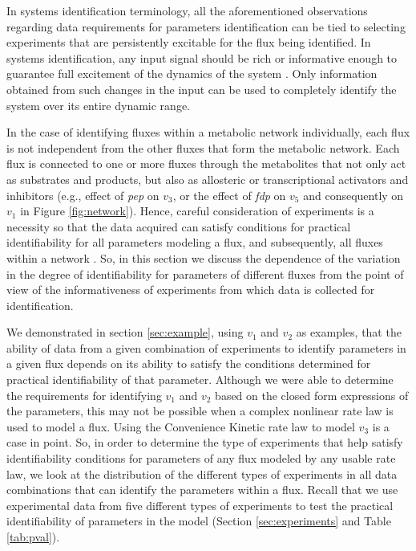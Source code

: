 \documentclass[10pt]{article}
\begin{document}
	In systems identification terminology, all the aforementioned observations regarding data requirements for parameters identification can be tied to selecting experiments that are persistently excitable for the flux being identified. In systems identification, any input signal should be rich or informative enough to guarantee full excitement of the dynamics of the system \parencite{Ljung1994}. Only information obtained from such changes in the input can be used to completely identify the system over its entire dynamic range. %
	
	In the case of identifying fluxes within a metabolic network individually, each flux is not independent from the other fluxes that form the metabolic network. Each flux is connected to one or more fluxes through the metabolites that not only act as substrates and products, but also as allosteric or transcriptional activators and inhibitors (e.g., effect of \textit{pep} on $v_3$, or the effect of \textit{fdp} on $v_5$ and consequently on $v_1$ in Figure \ref{fig:network}). Hence, careful consideration of experiments is a necessity so that the data acquired can satisfy conditions for practical identifiability for all parameters modeling a flux, and subsequently, all fluxes within a network \parencite{Heijnen2013}. So, in this section we discuss the dependence of the variation in the degree of identifiability for parameters of different fluxes from the point of view of the informativeness of experiments from which data is collected for identification.	
	
	We demonstrated in section \ref{sec:example}, using $v_1$ and $v_2$ as examples, that the ability of data from a given combination of experiments to identify parameters in a given flux depends on its ability to satisfy the conditions determined for practical identifiability of that parameter. Although we were able to determine the requirements for identifying $v_1$ and $v_2$ based on the closed form expressions of the parameters, this may not be possible when a complex nonlinear rate law is used to model a flux. Using the Convenience Kinetic rate law to model $v_3$ is a case in point. So, in order to determine the type of experiments that help satisfy identifiability conditions for parameters of any flux modeled by any usable rate law, we look at the distribution of the different types of experiments in all data combinations that can identify the parameters within a flux. Recall that we use experimental data from five different types of experiments to test the practical identifiability of parameters in the model (Section \ref{sec:experiments} and Table \ref{tab:pval}).
	
\end{document}
